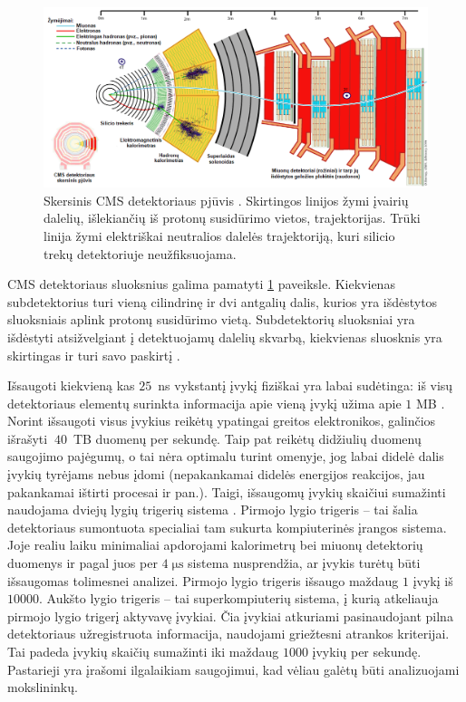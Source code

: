 \documentclass[a4paper, 12pt, oneside]{article}
\begin{document}
\begin{figure}[t]
	\includegraphics[width=\textwidth]{CMSslice_LT.png}
	\caption{\label{fig:CMSslice}Skersinis CMS detektoriaus pjūvis \cite{CMSslice}.
	Skirtingos linijos žymi įvairių dalelių, išlekiančių iš protonų susidūrimo vietos, trajektorijas.
	Trūki linija žymi elektriškai neutralios dalelės trajektoriją, kuri silicio trekų detektoriuje
	neužfiksuojama.}
\end{figure}

CMS detektoriaus sluoksnius galima pamatyti \ref{fig:CMSslice} paveiksle.
Kiekvienas subdetektorius turi vieną cilindrinę ir dvi antgalių dalis, kurios yra išdėstytos sluoksniais
aplink protonų susidūrimo vietą.
Subdetektorių sluoksniai yra išdėstyti atsižvelgiant į detektuojamų dalelių skvarbą, kiekvienas sluosknis
yra skirtingas ir turi savo paskirtį \cite{CMSexperiment}.

Išsaugoti kiekvieną kas $25$~ns vykstantį įvykį fiziškai yra labai sudėtinga: iš visų detektoriaus elementų
surinkta informacija apie vieną įvykį užima apie $1$ MB \cite{CMScomputing}.
Norint išsaugoti visus įvykius reikėtų ypatingai greitos elektronikos, galinčios išrašyti $~40$~TB duomenų
per sekundę.
Taip pat reikėtų didžiulių duomenų saugojimo pajėgumų, o tai nėra optimalu turint omenyje, jog labai didelė dalis
įvykių tyrėjams nebus įdomi (nepakankamai didelės energijos reakcijos, jau pakankamai ištirti procesai ir pan.).
Taigi, išsaugomų įvykių skaičiui sumažinti naudojama dviejų lygių trigerių sistema \cite{CMStrig}.
Pirmojo lygio trigeris -- tai šalia detektoriaus sumontuota specialiai tam sukurta kompiuterinės
įrangos sistema.
Joje realiu laiku minimaliai apdorojami kalorimetrų bei miuonų detektorių duomenys ir pagal juos per
$4 \; \mathrm{\mu s}$ sistema nusprendžia, ar įvykis turėtų būti išsaugomas tolimesnei analizei. 
Pirmojo lygio trigeris išsaugo maždaug $1$ įvykį iš $10000$.
Aukšto lygio trigeris -- tai superkompiuterių sistema, į kurią atkeliauja pirmojo lygio trigerį
aktyvavę įvykiai.
Čia įvykiai atkuriami pasinaudojant pilna detektoriaus užregistruota informacija, naudojami
griežtesni atrankos kriterijai.
Tai padeda įvykių skaičių sumažinti iki maždaug $1000$ įvykių per sekundę.
Pastarieji yra įrašomi ilgalaikiam saugojimui, kad vėliau galėtų būti analizuojami mokslininkų.
\end{document}
